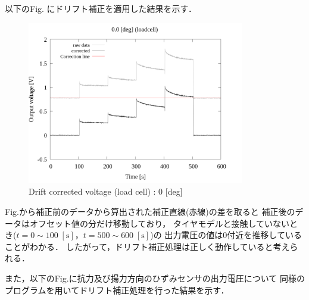 以下のFig. にドリフト補正を適用した結果を示す．

\begin{figure}[htbp]
	\footnotesize
	\begin{center}
		\includegraphics[width=95mm]{../../02_workspace/result/2-1/plot/02-1_loadcell/02_loadcell-drift_0.png}
		\caption{Drift corrected voltage (load cell) : 0 [deg]}
	\end{center}
\end{figure}

Fig.から補正前のデータから算出された補正直線(赤線)の差を取ると
補正後のデータはオフセット値の分だけ移動しており，
タイヤモデルと接触していないとき($t = 0 \sim 100 \; [\mathrm{s}]$，$t = 500 \sim 600 \; [\mathrm{s}]$)の
出力電圧の値は0付近を推移していることがわかる．
したがって，ドリフト補正処理は正しく動作していると考えられる．

また，以下のFig.に抗力及び揚力方向のひずみセンサの出力電圧について
同様のプログラムを用いてドリフト補正処理を行った結果を示す．

